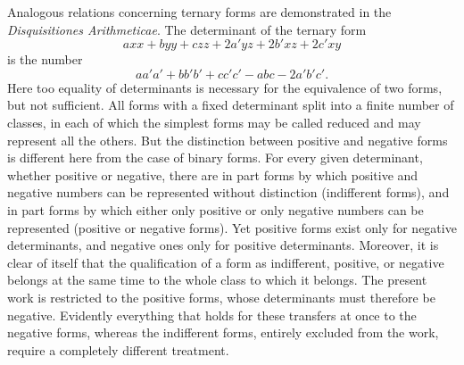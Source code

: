 \documentclass[12pt]{article}
\begin{document}
Analogous relations concerning ternary forms are demonstrated in the \textit{Disquisitiones Arithmeticae}. The determinant of the ternary form
\[
axx+byy+czz+2a'yz+2b'xz+2c'xy
\]
is the number
\[
aa'a'+bb'b'+cc'c'-abc-2a'b'c'.
\]
Here too equality of determinants is necessary for the equivalence of two forms, but not sufficient. All forms with a fixed determinant split into a finite number of classes, in each of which the simplest forms may be called reduced and may represent all the others. But the distinction between positive and negative forms is different here from the case of binary forms. For every given determinant, whether positive or negative, there are in part forms by which positive and negative numbers can be represented without distinction (indifferent forms), and in part forms by which either only positive or only negative numbers can be represented (positive or negative forms). Yet positive forms exist only for negative determinants, and negative ones only for positive determinants. Moreover, it is clear of itself that the qualification of a form as indifferent, positive, or negative belongs at the same time to the whole class to which it belongs. The present work is restricted to the positive forms, whose determinants must therefore be negative. Evidently everything that holds for these transfers at once to the negative forms, whereas the indifferent forms, entirely excluded from the work, require a completely different treatment.
\end{document}
